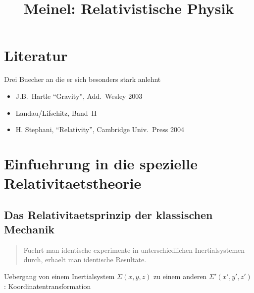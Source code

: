 \documentclass{scrartcl}
\begin{document}
\title{Meinel: Relativistische Physik}
\maketitle

\section{Literatur}
Drei Buecher an die er sich besonders stark anlehnt

\begin{itemize}
\item J.B.~Hartle ``Gravity'', Add.~Wesley 2003
\item Landau/Lifschitz, Band~II
\item H. Stephani, ``Relativity'', Cambridge Univ.\ Press 2004
\end{itemize}

\section{Einfuehrung in die spezielle Relativitaetstheorie}
\subsection{Das Relativitaetsprinzip der klassischen Mechanik}
\begin{quote}
  Fuehrt man identische experimente in unterschiedlichen
  Inertialsystemen durch, erhaelt man identische Resultate.
\end{quote}

Uebergang von einem Inertialsystem $\Sigma(x,y,z)$ zu einem anderen
$\Sigma'(x',y',z')$:
Koordinatentransformation
\end{document}
